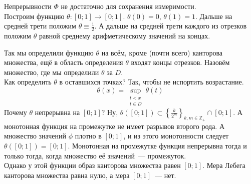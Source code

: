 \documentclass{article}
\begin{document}
    \begin{example}
        Непрерывности $\Phi$ не достаточно для сохранения измеримости.\\
        Построим функцию $\theta\colon[0;1]\to[0;1]$. $\theta(0)=0$, $\theta(1)=1$. Дальше на средней трети положим $\theta\equiv\frac12$. А дальше на средней трети каждого из отрезков положим $\theta$ равной среднему арифметическому значений на концах.
        \begin{figure}[H]
        \end{figure}\noindent
        Так мы определили функцию $\theta$ на всём, кроме (почти всего) канторова множества, ещё в область определения $\theta$ входят концы отрезков. Назовём множество, где мы определили $\theta$ за $D$.\\
        Как определить $\theta$ в оставшихся точках? Так, чтобы не испортить возрастание.
        $$
        \theta(x)=\sup\limits_{\substack{t<x\\t\in D}}\theta(t)
        $$
        Почему $\theta$ непрерывна на $[0;1]$? Ну, $\theta([0;1])\subset\left\{\frac k{2^m}\right\}_{k,m\in\mathbb Z_+}\cap[0;1]$. А монотонная функция на промежутке не имеет разрывов второго рода. А множество значений $\phi$ плотно в $[0;1]$, и из этого монотонности следует $\theta([0;1])=[0;1]$. Монотонная на промежутке функция непрерывна тогда и только тогда, когда множество её значений~--- промежуток.\\
        Однако у этой функции образ канторова множества равен $[0;1]$. Мера Лебега канторова множества равна нулю, а мера $[0;1]$~--- нет.
    \end{example}
\end{document}
